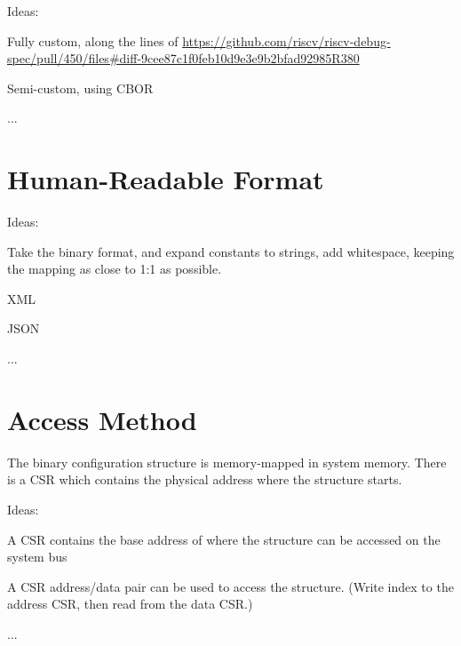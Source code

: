 \begin{steps}{Ideas:}
\item Fully custom, along the lines of
    \url{https://github.com/riscv/riscv-debug-spec/pull/450/files#diff-9cee87c1f0feb10d9e3e9b2bfad92985R380}
\item Semi-custom, using CBOR
\item ...
\end{steps}

\chapter{Human-Readable Format}

\begin{steps}{Ideas:}
\item Take the binary format, and expand constants to strings, add whitespace,
keeping the mapping as close to 1:1 as possible.
\item XML
\item JSON
\item ...
\end{steps}

\chapter{Access Method}
\label{sec:AccessMethod}

The binary configuration structure is memory-mapped in system memory. There
is a CSR which contains the physical address where the structure starts.

\begin{steps}{Ideas:}
\item A CSR contains the base address of where the structure can be accessed on
the system bus
\item A CSR address/data pair can be used to access the structure. (Write index
to the address CSR, then read from the data CSR.)
\item ...
\end{steps}
